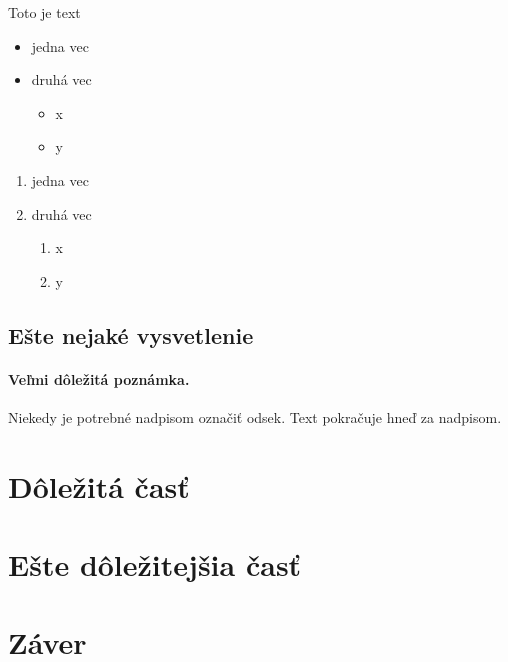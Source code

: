 \documentclass[10pt,twocolumn,twoside,slovak,a4paper]{article}
\begin{document}
Toto je text

\begin{itemize}
\item jedna vec
\item druhá vec
	\begin{itemize}
	\item x
	\item y
	\end{itemize}
\end{itemize}


\begin{enumerate}
\item jedna vec
\item druhá vec
	\begin{enumerate}
	\item x
	\item y
	\end{enumerate}
\end{enumerate}


\subsection{Ešte nejaké vysvetlenie} \label{ina:este}

\paragraph{Veľmi dôležitá poznámka.}
Niekedy je potrebné nadpisom označiť odsek. Text pokračuje hneď za nadpisom.



\section{Dôležitá časť} \label{dolezita}




\section{Ešte dôležitejšia časť} \label{dolezitejsia}




\section{Záver} \label{zaver} %






\end{document}
